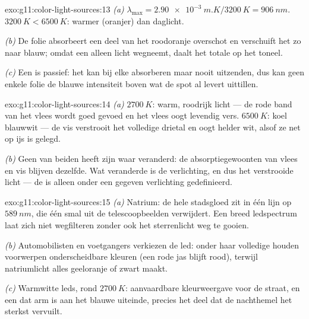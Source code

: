 \begin{solution}{exo:g11:color-light-sources:13}
\emph{(a)} $\lambda_{\max} = \qty{2.90e-3}{m.K}/\qty{3200}{K} =
\qty{906}{nm}$.  $\qty{3200}{K} < \qty{6500}{K}$: warmer
(oranjer) dan daglicht.

\emph{(b)} De folie absorbeert een deel van het roodoranje overschot en
verschuift het  zo naar blauw; omdat een  alleen licht
wegneemt, daalt het totale  op het toneel.

\emph{(c)} Een  is passief: het kan bij elke 
absorberen maar nooit uitzenden, dus kan geen enkele folie de blauwe
intensiteit boven wat de spot al levert uittillen.
\end{solution}

\begin{solution}{exo:g11:color-light-sources:14}
\emph{(a)} $\qty{2700}{K}$: warm, roodrijk licht --- de rode band van het
vlees wordt goed gevoed en het vlees oogt levendig vers.
$\qty{6500}{K}$: koel blauwwit --- de vis verstrooit het volledige
drietal en oogt helder wit, alsof ze net op ijs is gelegd.

\emph{(b)} Geen van beiden heeft zijn waar veranderd: de
absorptiegewoonten van vlees en vis blijven dezelfde. Wat veranderde is
de verlichting, en dus het verstrooide licht --- de  is alleen onder een gegeven verlichting gedefinieerd.
\end{solution}

\begin{solution}{exo:g11:color-light-sources:15}
\emph{(a)} Natrium: de hele stadsgloed zit in één lijn op
$\qty{589}{nm}$, die één smal  uit de telescoopbeelden verwijdert.
Een breed ledspectrum laat zich niet wegfilteren zonder ook het
sterrenlicht weg te gooien.

\emph{(b)} Automobilisten en voetgangers verkiezen de led: onder haar
volledige  houden voorwerpen onderscheidbare kleuren (een rode
jas blijft rood), terwijl natriumlicht alles geeloranje of zwart maakt.

\emph{(c)} Warmwitte leds, rond $\qty{2700}{K}$: aanvaardbare
kleurweergave voor de straat, en een  dat arm is aan het blauwe
uiteinde, precies het deel dat de nachthemel het sterkst vervuilt.
\end{solution}


